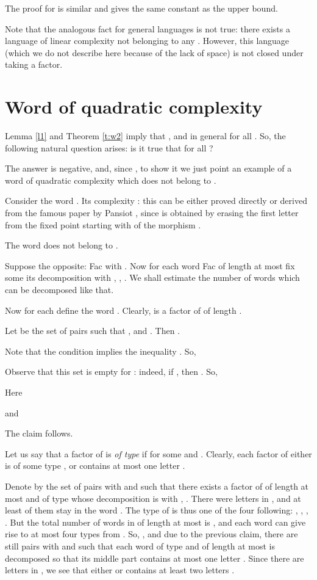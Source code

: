 \documentclass[runningheads,envcountsect,envcountsame]{llncs}
\begin{document}
The proof for  is similar and gives the same constant as the upper bound. \hfill 

\medskip
Note that the analogous fact for general languages is not true: there exists a language of linear complexity not belonging to any . However, this language (which we do not describe here because of the lack of space) is not closed under taking a factor.
\section{Word of quadratic complexity}

Lemma \ref{l1} and Theorem  \ref{t:w2} imply that , and in general  for all . So, the following natural question
arises: is it true that  for all
?


The answer is negative, and, since , to show it we just point an example of a word of quadratic complexity which does not belong to .

Consider the word . Its complexity : this can be either proved directly or derived from the famous paper by Pansiot \cite{pansiot}, since  is obtained by erasing the first letter  from the fixed point starting with  of the morphism .

\begin{lemma}\label{babaab}
        The word  does not belong to .
\end{lemma}
Suppose the opposite: Fac with . Now for each word Fac of length at most  fix some its decomposition  with , , . We shall estimate the number of words  which can be decomposed like that.

Now for each  define the word . Clearly,  is a factor of  of length .

\begin{claim}
Let   be the set of pairs   such that ,   and . Then .
\end{claim}
 Note that the condition  implies the inequality . So,


Observe that this set is empty for : indeed, if , then . So,


Here
 
and
 
The claim follows. \hfill 

\medskip
Let us say that a factor  of  is {\it of type } if  for some  and . Clearly, each factor of  either is of some type , or contains at most one letter .

Denote by  the set of pairs  with  and  such that there exists a factor  of  of length at most  and of type  whose decomposition is  with , . There were  letters  in , and at least  of them stay in the word . The type of  is thus one of the four following: ,
, , . But the total number of words in  of length at most  is , and each word  can give rise to at most four types from . So, , and due to the previous claim, there are still  pairs  with  and  such that each word  of type  and of length at most  is decomposed so that its middle part  contains at most one letter . Since there are  letters  in , we see that either  or  contains at least two letters .
\end{document}
